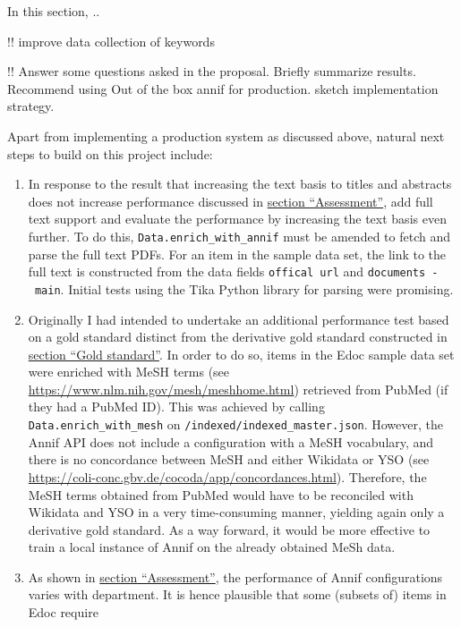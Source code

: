 In this section, ..

!! improve data collection of keywords

!! Answer some questions asked in the proposal. Briefly summarize
results. Recommend using Out of the box annif for production. sketch
implementation strategy.

Apart from implementing a production system as discussed above, natural
next steps to build on this project include:

\begin{enumerate}
\def\labelenumi{\arabic{enumi}.}
\item
  In response to the result that increasing the text basis to titles and
  abstracts does not increase performance discussed in
  \protect\hyperlink{assessment}{section ``Assessment''}, add full text
  support and evaluate the performance by increasing the text basis even
  further. To do this, \texttt{Data.enrich\_with\_annif} must be amended
  to fetch and parse the full text PDFs. For an item in the sample data
  set, the link to the full text is constructed from the data fields
  \texttt{offical\ url} and \texttt{documents\ -\ main}. Initial tests
  using the Tika Python library for parsing were promising.
\item
  Originally I had intended to undertake an additional performance test
  based on a gold standard distinct from the derivative gold standard
  constructed in \protect\hyperlink{gold-standard}{section ``Gold
  standard''}. In order to do so, items in the Edoc sample data set were
  enriched with MeSH terms (see
  \url{https://www.nlm.nih.gov/mesh/meshhome.html}) retrieved from
  PubMed (if they had a PubMed ID). This was achieved by calling
  \texttt{Data.enrich\_with\_mesh} on
  \texttt{/indexed/indexed\_master.json}. However, the Annif API does
  not include a configuration with a MeSH vocabulary, and there is no
  concordance between MeSH and either Wikidata or YSO (see
  \url{https://coli-conc.gbv.de/cocoda/app/concordances.html}).
  Therefore, the MeSH terms obtained from PubMed would have to be
  reconciled with Wikidata and YSO in a very time-consuming manner,
  yielding again only a derivative gold standard. As a way forward, it
  would be more effective to train a local instance of Annif on the
  already obtained MeSh data.
\item
  As shown in \protect\hyperlink{assessment}{section ``Assessment''},
  the performance of Annif configurations varies with department. It is
  hence plausible that some (subsets of) items in Edoc require

\end{enumerate}
